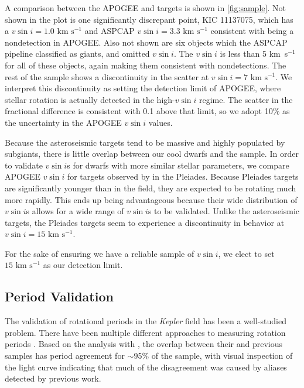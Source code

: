 \documentclass[manuscript]{aastex6}
\newcommand{\vsini}{\ensuremath{v \sin i}}
\newcommand{\Kepler}{\mbox{\textit{Kepler}}}
\newcommand{\kms}{\textrm{ km~s}\ensuremath{^{-1}}}
\newcommand{\gvs}{\authorcomment1}
\begin{document}
A comparison between the APOGEE and \citet{Bruntt12} targets is shown in
\cref{fig:sample}. Not shown in the plot is one significantly discrepant point, 
KIC 11137075, which has a \citet{Bruntt12}
\(\vsini = 1.0 \kms\) and ASPCAP \(\vsini = 3.3 \kms\) consistent with being a
nondetection in APOGEE. Also not shown are six
objects which the ASPCAP pipeline classified as giants, and omitted
\vsini{}. The \citet{Bruntt12} \vsini{} is less than 5
\kms{} for all of these objects, again making them consistent with nondetections.
The rest of the sample shows a discontinuity in the scatter at \citet{Bruntt12} 
\(\vsini=7\kms\). We interpret this discontinuity as setting the detection limit 
of APOGEE, where stellar rotation is actually detected in the high-\vsini{} 
regime.  The scatter in the fractional difference is consistent with 0.1 above that
limit, so we adopt 10\% as the uncertainty in the APOGEE \vsini{} values.

Because the asteroseismic targets tend to be massive and highly populated by
subgiants, there is little overlap between our cool dwarfs and the 
\citet{Bruntt12} sample. In order to validate \vsini{}s for dwarfs with more
similar stellar parameters, we compare
APOGEE \vsini{} for targets observed by \citet{Stauffer87} in the
Pleiades. Because Pleiades targets are significantly younger than in the field,
they are expected to be rotating much more rapidly. This ends up being
advantageous because their wide
distribution of \vsini{}s allows for a wide range of \vsini{}s to be validated. 
Unlike the asteroseismic targets, the Pleiades targets seem to experience a
discontinuity in behavior at \(\vsini = 15 \kms\). \gvs{Check that scatter above
is consistent with 10\%}

For the sake of ensuring we have a reliable sample of \vsini{}, we elect to set
\(15 \kms\) as our detection limit.

\subsection{Period Validation}

The validation of rotational periods in the \Kepler{} field has been a
well-studied problem. There have been multiple different approaches to
measuring rotation periods \citep{Reinhold13,Nielsen13,McQuillan14,Garcia14}.
Based on the analysis with \citet{McQuillan14}, the overlap between their
and previous samples has period agreement for \(\sim\)95\% of the
sample, with visual 
inspection of the light curve indicating that much of the disagreement was 
caused by aliases detected by previous work. 
\end{document}
